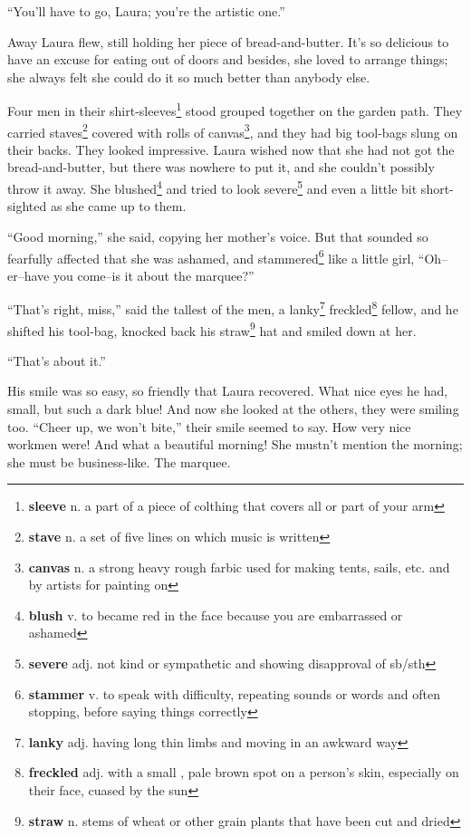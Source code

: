 ``You'll have to go, Laura; you're the artistic one.''

Away Laura flew, still holding her piece of bread-and-butter. It's so delicious to have an excuse for eating out of doors and besides, she loved to arrange things; she always felt she could do it so much better than anybody else.

Four men in their shirt-sleeves\footnote{\textbf{sleeve} n. a part of a piece of colthing that covers all or part of your arm} stood grouped together on the garden path. They carried staves\footnote{\textbf{stave} n. a set of five lines on which music is written} covered with rolls of canvas\footnote{\textbf{canvas} n. a strong heavy rough farbic used for making tents, sails, etc. and by artists for painting on}, and they had big tool-bags slung on their backs. They looked impressive. Laura wished now that she had not got the bread-and-butter, but there was nowhere to put it, and she couldn't possibly throw it away. She blushed\footnote{\textbf{blush} v. to became red in the face because you are embarrassed or ashamed} and tried to look severe\footnote{\textbf{severe} adj. not kind or sympathetic and showing disapproval of sb/sth} and even a little bit short-sighted as she came up to them.

``Good morning,'' she said, copying her mother's voice. But that sounded so fearfully affected that she was ashamed, and stammered\footnote{\textbf{stammer} v. to speak with difficulty, repeating sounds or words and often stopping, before saying things correctly} like a little girl, ``Oh--er--have you come--is it about the marquee?''

``That's right, miss,'' said the tallest of the men, a lanky\footnote{\textbf{lanky} adj. having long thin limbs and moving in an awkward way} freckled\footnote{\textbf{freckled} adj. with a small , pale brown spot on a person's skin, especially on their face, cuased by the sun} fellow, and he shifted his tool-bag, knocked back his straw\footnote{\textbf{straw} n. stems of wheat or other grain plants that have been cut and dried} hat and smiled down at her.

``That's about it.''

His smile was so easy, so friendly that Laura recovered. What nice eyes he had, small, but such a dark blue! And now she looked at the others, they were smiling too. ``Cheer up, we won't bite,'' their smile seemed to say. How very nice workmen were! And what a beautiful morning! She mustn't mention the morning; she must be business-like. The marquee.

